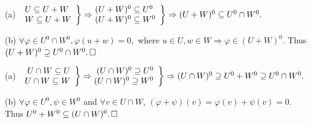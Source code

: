 \documentclass[a4paper, 11pt, UTF8]{article}
\def\BulletPoint{{\small\bullet}}
\begin{document}
\begin{large}
\par\quad
(a) $\MathRightBrace{l}{U\subseteq U+W\\W\subseteq U+W}\Rightarrow\hspace{-6pt}\MathRightBrace{l}{(U+W)^0\subseteq U^0 \\ (U+W)^0\subseteq W^0}\Rightarrow(U+W)^0\subseteq U^0\cap W^0.$\par\vspace{6pt}\quad
(b) $\forall\varphi\in U^0\cap W^0,\varphi(u+w)=0,$ where $u\in U,w\in W \Rightarrow\varphi\in (U+W)^0$. Thus $(U+W)^0\supseteq U^0\cap W^0.\,\hfill\square$
\SepLine\par

\par\quad
(a) $\MathRightBrace{r}{U\cap W\subseteq U\\U\cap W\subseteq W}\Rightarrow\hspace{-6pt}\MathRightBrace{r}{(U\cap W)^0\supseteq U^0 \\ (U\cap W)^0\supseteq W^0}\Rightarrow(U\cap W)^0\supseteq U^0+W^0\supseteq U^0\cap W^0.$\par\vspace{6pt}\quad
(b) $\forall\varphi\in U^0,\psi\in W^0$ and $\forall v\in U\cap W$, $(\varphi+\psi)(v)=\varphi(v)+\psi(v)=0$. Thus $U^0+W^0\subseteq (U\cap W)^0.\,\hfill\square$
\SepLine\par

\BulletPoint \,\hspace{1pt}\Corollary\;\;
\SepLine\par


\end{large}
\end{document}
